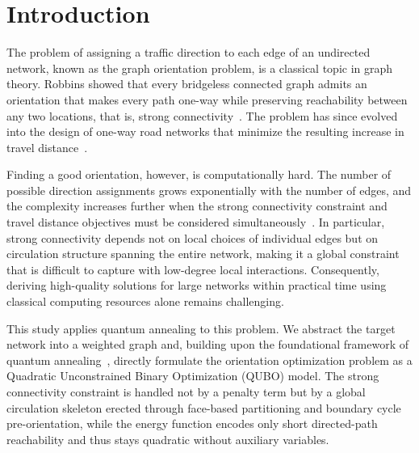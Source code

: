 \documentclass[twocolumn,a4paper]{article}
\begin{document}
\section{Introduction} \label{sec:intro}

The problem of assigning a traffic direction to each edge of an undirected network, known as the graph orientation problem, is a classical topic in graph theory. Robbins showed that every bridgeless connected graph admits an orientation that makes every path one-way while preserving reachability between any two locations, that is, strong connectivity~\cite{robbins1939theorem}. The problem has since evolved into the design of one-way road networks that minimize the resulting increase in travel distance~\cite{drezner1997selecting}.

Finding a good orientation, however, is computationally hard. The number of possible direction assignments grows exponentially with the number of edges, and the complexity increases further when the strong connectivity constraint and travel distance objectives must be considered simultaneously~\cite{burkard1999minimum, bangjensen2023complexity}. In particular, strong connectivity depends not on local choices of individual edges but on circulation structure spanning the entire network, making it a global constraint that is difficult to capture with low-degree local interactions. Consequently, deriving high-quality solutions for large networks within practical time using classical computing resources alone remains challenging.

This study applies quantum annealing to this problem. We abstract the target network into a weighted graph and, building upon the foundational framework of quantum annealing~\cite{Kadowaki1998}, directly formulate the orientation optimization problem as a Quadratic Unconstrained Binary Optimization (QUBO) model. The strong connectivity constraint is handled not by a penalty term but by a global circulation skeleton erected through face-based partitioning and boundary cycle pre-orientation, while the energy function encodes only short directed-path reachability and thus stays quadratic without auxiliary variables.
\end{document}
